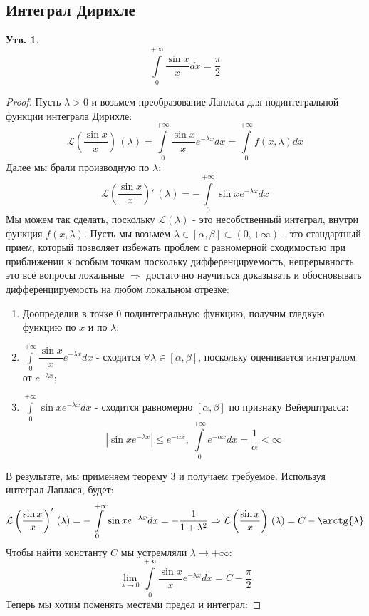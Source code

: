 \documentclass[12pt]{article}
\newcommand{\ML}{\mathcal{L}}
\theoremstyle{definition}
\newtheorem{prop}{Утв.}
\newcommand{\ddint}[2]{\displaystyle\int\limits_{#1}^{#2}}
\begin{document}
\subsection*{Интеграл Дирихле}
\begin{prop}
	$$
		\ddint{0}{+\infty}\dfrac{\sin{x}}{x}dx = \dfrac{\pi}{2}
	$$
\end{prop}
\begin{proof}
	Пусть $\lambda > 0$ и возьмем преобразование Лапласа для подинтегральной функции интеграла Дирихле:
	$$
		\ML\left(\dfrac{\sin{x}}{x}\right) \, (\lambda) = \ddint{0}{+\infty}\dfrac{\sin{x}}{x}e^{-\lambda x}dx = \ddint{0}{+\infty}f(x,\lambda)dx
	$$
	Далее мы брали производную по $\lambda$:
	$$
		\ML\left(\dfrac{\sin{x}}{x}\right)' \, (\lambda) = - \ddint{0}{+\infty}\sin{x}e^{-\lambda x}dx
	$$
	Мы можем так сделать, поскольку $\ML(\lambda)$ - это несобственный интеграл, внутри функция $f(x,\lambda)$. Пусть мы возьмем $\lambda \in [\alpha, \beta] \subset (0, +\infty)$ - это стандартный прием, который позволяет избежать проблем с равномерной сходимостью при приближении к особым точкам поскольку дифференцируемость, непрерывность это всё вопросы локальные $\Rightarrow$ достаточно научиться доказывать и обосновывать дифференцируемость на любом локальном отрезке: 
	\begin{enumerate}[label=(\arabic*)]\addtocounter{enumi}{-1}
		\item Доопределив в точке $0$ подинтегральную функцию, получим гладкую функцию по $x$ и по $\lambda$;
		\item $\ddint{0}{+\infty}\dfrac{\sin{x}}{x}e^{-\lambda x}dx$ - сходится $\forall \lambda \in [\alpha, \beta]$, поскольку оценивается интегралом от $e^{-\lambda x}$;
		\item $\ddint{0}{+\infty}\sin{x}e^{-\lambda x}dx$ - сходится равномерно $[\alpha,\beta]$ по признаку Вейерштрасса:
		$$
			|\sin{x}e^{-\lambda x}| \leq e^{-\alpha x}, \, \ddint{0}{+\infty}e^{-\alpha x}dx = \dfrac{1}{\alpha} < \infty
		$$
	\end{enumerate}
	В результате, мы применяем теорему $3$ и получаем требуемое. Используя интеграл Лапласа, будет:
	$$
		\ML\left(\dfrac{\sin{x}}{x}\right)' \, (\lambda) = - \ddint{0}{+\infty}\sin{x}e^{-\lambda x}dx = - \dfrac{1}{1 + \lambda^2} \Rightarrow \ML\left(\dfrac{\sin{x}}{x}\right) \, (\lambda) = C - \arctg{\lambda}
	$$
	Чтобы найти константу $C$ мы устремляли $\lambda \to +\infty$:
	$$
		\lim\limits_{\lambda \to 0}\ddint{0}{+\infty}\dfrac{\sin{x}}{x}e^{-\lambda x}dx = C - \dfrac{\pi}{2}
	$$
	Теперь мы хотим поменять местами предел и интеграл:

\end{proof}
\end{document}
